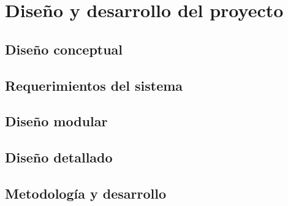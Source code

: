 \section{Diseño y desarrollo del proyecto}


\subsection{Diseño conceptual}


\subsection{Requerimientos del sistema}


\subsection{Diseño modular}


\subsection{Diseño detallado}


\subsection{Metodología y desarrollo}

